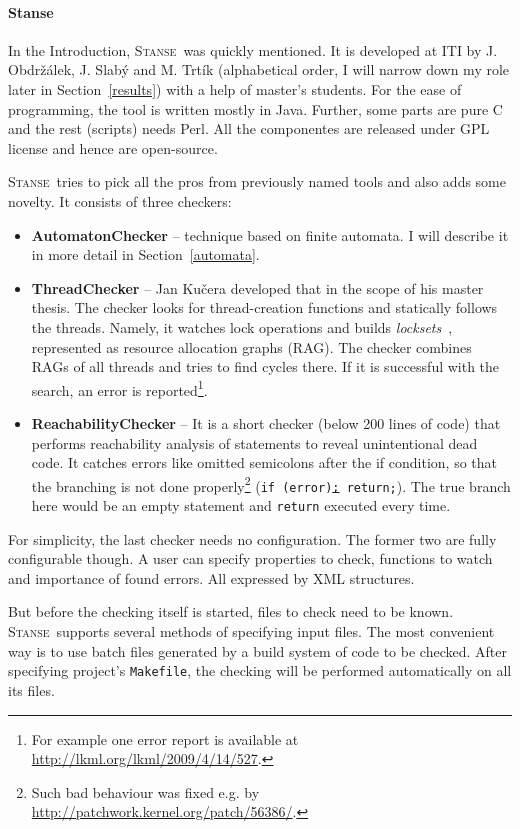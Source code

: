 \documentclass[11pt,a4paper]{article}
\newcommand{\stan}{\textsc{Stanse}}
\begin{document}
\paragraph{Stanse}\label{stanse} In the Introduction, \stan\ was quickly
mentioned. It is developed at ITI by J. Obdržálek, J. Slabý and M. Trtík
(alphabetical order, I will narrow down my role later in
Section~\ref{results}) with a help of master's students. For the ease of
programming, the tool is written mostly in Java. Further, some parts are pure
C and the rest (scripts) needs Perl. All the componentes are released under
GPL license and hence are open-source.

\stan\ tries to pick all the pros from previously named tools and also adds
some novelty. It consists of three checkers:
\begin{itemize}
\item \textbf{AutomatonChecker} -- technique based on finite automata. I will
describe it in more detail in Section~\ref{automata}.
\item \textbf{ThreadChecker} -- Jan Kučera developed that in the scope of his
master thesis. The checker looks for thread-creation functions and statically
follows the threads. Namely, it watches lock operations and builds
\emph{locksets}~\cite{lockset}, represented as resource allocation graphs
(RAG). The checker combines RAGs of all threads and tries to find cycles
there. If it is successful with the search, an error is reported\footnote{For
example one error report is available at
\url{http://lkml.org/lkml/2009/4/14/527}.}.
\item \textbf{ReachabilityChecker} -- It is a short checker (below 200 lines
of code) that performs reachability analysis of statements to reveal
unintentional dead code. It catches errors like omitted semicolons after the
if condition, so that the branching is not done properly\footnote{Such bad
behaviour was fixed e.g. by \url{http://patchwork.kernel.org/patch/56386/}.}
(\texttt{if (error)\underline{;} return;}). The true branch here would
be an empty statement and \texttt{return} executed every time.
\end{itemize}

For simplicity, the last checker needs no configuration. The former two are
fully configurable though. A user can specify properties to check,
functions to watch and importance of found errors. All expressed by XML
structures.

But before the checking itself is started, files to check need to be known.
\stan\ supports several methods of specifying input files. The most convenient
way is to use batch files generated by a build system of code to be checked.
After specifying project's \texttt{Makefile}, the checking will be performed
automatically on all its files.
\end{document}
